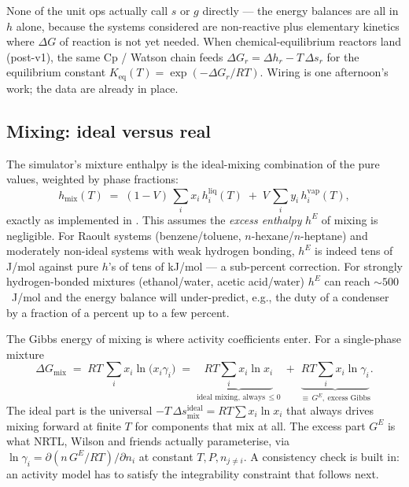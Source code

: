 \documentclass[11pt,a4paper]{article}
\begin{document}
\begin{intuition}
None of the unit ops  actually call $s$ or $g$ directly ---
the energy balances are all in $h$ alone, because the systems
considered are non-reactive plus elementary kinetics where $\Delta G$
of reaction is not yet needed.  When chemical-equilibrium reactors
land (post-v1), the same Cp / Watson chain feeds $\Delta G_r =
\Delta h_r - T\,\Delta s_r$ for the equilibrium constant
$K_{\mathrm{eq}}(T) = \exp(-\Delta G_r / RT)$.  Wiring is one
afternoon's work; the data are already in place.
\end{intuition}

\subsection{Mixing: ideal versus real}

The simulator's mixture enthalpy is the ideal-mixing combination of
the pure values, weighted by phase fractions:
\begin{equation}
   h_{\mathrm{mix}}(T) \;=\; (1 - V)\,\sum_i x_i\,h^{\mathrm{liq}}_i(T)
                       \;+\; V\,\sum_i y_i\,h^{\mathrm{vap}}_i(T),
   \label{eq:integral-hmix}
\end{equation}
exactly as implemented in .  This
assumes the \emph{excess enthalpy} $h^E$ of mixing is negligible.
For Raoult systems (benzene/toluene, $n$-hexane/$n$-heptane) and
moderately non-ideal systems with weak hydrogen bonding, $h^E$ is
indeed tens of J/mol against pure $h$'s of tens of kJ/mol --- a
sub-percent correction.  For strongly hydrogen-bonded mixtures
(ethanol/water, acetic acid/water) $h^E$ can reach $\sim 500$~J/mol
and the energy balance will under-predict, e.g., the duty of a
condenser by a fraction of a percent up to a few percent.

The Gibbs energy of mixing is where activity coefficients enter.
For a single-phase mixture
\begin{equation}
   \boxed{\;
   \Delta G_{\mathrm{mix}} \;=\; RT\,\sum_i x_i \ln\!\bigl(x_i \gamma_i\bigr)
     \;=\;\underbrace{RT\sum_i x_i \ln x_i}_{\text{ideal mixing, always}\,\le 0}
     \;+\; \underbrace{RT\sum_i x_i \ln \gamma_i}_{\equiv\,G^E,\ \text{excess Gibbs}}.
   \;}
   \label{eq:integral-Gmix}
\end{equation}
The ideal part is the universal $-T\,\Delta s_{\mathrm{mix}}^{\mathrm{ideal}}
= RT \sum x_i \ln x_i$ that always drives mixing forward at finite
$T$ for components that mix at all.  The excess part $G^E$ is what
NRTL, Wilson and friends actually parameterise, via $\ln \gamma_i =
\partial(n\,G^E/RT)/\partial n_i$ at constant $T, P, n_{j\neq i}$.
A consistency check is built in: an activity model has to satisfy
the integrability constraint that follows next.
\end{document}
